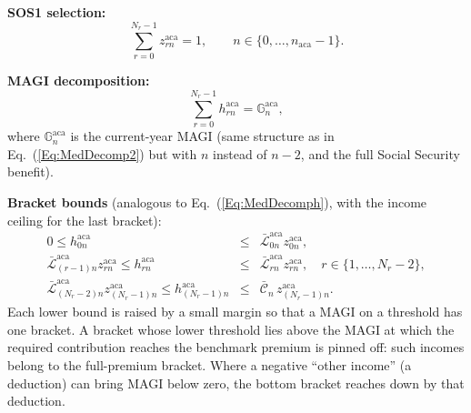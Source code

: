 \documentclass[fleqn,12pt]{report}
\begin{document}
	\textbf{SOS1 selection:}
	\begin{equation}
		\sum_{r=0}^{N_r-1} z_{rn}^{\mathrm{aca}} = 1,
		\qquad n \in \{0, \ldots, n_{\mathrm{aca}}-1\}.
	\end{equation}

	\textbf{MAGI decomposition:}
	\begin{equation}
		\sum_{r=0}^{N_r-1} h^{\mathrm{aca}}_{rn} = \mathbb{G}^{\mathrm{aca}}_n,
	\end{equation}
	where $\mathbb{G}^{\mathrm{aca}}_n$ is the current-year MAGI (same structure as in Eq.~(\ref{Eq:MedDecomp2})
	but with $n$ instead of $n-2$, and the full Social Security benefit).

	\textbf{Bracket bounds} (analogous to Eq.~(\ref{Eq:MedDecomph}), with the income ceiling
	for the last bracket):
	\begin{eqnarray}
		0 \le h^{\mathrm{aca}}_{0n} &\le& \bar{\mathcal{L}}^{\mathrm{aca}}_{0n} z_{0n}^{\mathrm{aca}}, \nonumber \\
		\bar{\mathcal{L}}^{\mathrm{aca}}_{(r-1)n} z_{rn}^{\mathrm{aca}}
		\le h^{\mathrm{aca}}_{rn} &\le& \bar{\mathcal{L}}^{\mathrm{aca}}_{rn} z_{rn}^{\mathrm{aca}},
		\quad r \in \{1,\ldots,N_r-2\}, \nonumber \\
		\bar{\mathcal{L}}^{\mathrm{aca}}_{(N_r-2)n}
		z_{(N_r-1)n}^{\mathrm{aca}}
		\le h^{\mathrm{aca}}_{(N_r-1)n}
		&\le& \bar{\mathcal{C}}_n\, z_{(N_r-1)n}^{\mathrm{aca}}.
	\end{eqnarray}
	Each lower bound is raised by a small margin so that a MAGI on a threshold has one bracket.
	A bracket whose lower threshold lies above the MAGI at which the required contribution reaches
	the benchmark premium is pinned off: such incomes belong to the full-premium bracket.
	Where a negative ``other income'' (a deduction) can bring MAGI below zero, the bottom bracket
	reaches down by that deduction.
\end{document}

